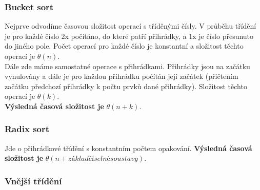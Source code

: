\documentclass[10pt,a4paper]{article}
\begin{document}
\subsubsection{Bucket sort}
Nejprve odvodíme časovou složitost operací s tříděnými čísly. V průběhu třídění je pro každé číslo 2x počítáno, do které patří přihrádky, a 1x je číslo přesunuto do jiného pole. Počet operací pro každé číslo je konstantní a složitost těchto operací je $\theta (n)$. \\
Dále zde máme samostatné operace s přihrádkami. Přihrádky jsou na začátku vynulovány a dále je pro každou přihrádku počítán její začátek (přičtením začátku předchozí přihrádky k počtu prvků dané přihrádky). Složitost těchto operací je $\theta (k)$. \\
\textbf{Výsledná časová složitost je} $\theta (n+k)$.

\subsubsection{Radix sort}
Jde o přihrádkové třídění s konstantním počtem opakování. \textbf{Výsledná časová složitost je} $\theta (n + základ číselné soustavy)$.

\subsubsection{Vnější třídění}
\end{document}
